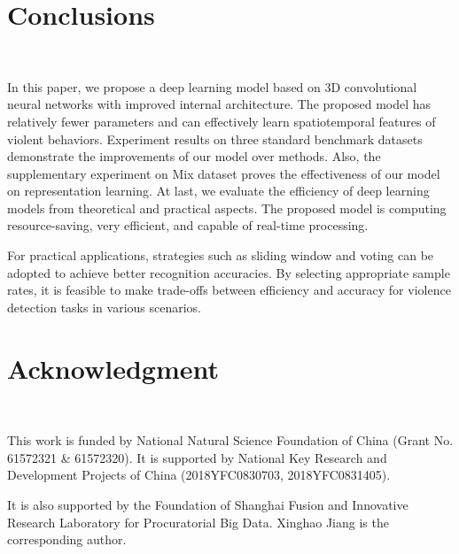 \documentclass[10pt,twocolumn,letterpaper]{article}
\begin{document}

\section{Conclusions}
~\label{sec:5}

In this paper, we propose a deep learning model based on 3D convolutional neural networks with improved internal architecture. 
The proposed model has relatively fewer parameters and can effectively learn spatiotemporal features of violent behaviors. 
Experiment results on three standard benchmark datasets demonstrate the improvements of our model over methods. 
Also, the supplementary experiment on Mix dataset proves the effectiveness of our model on representation learning. 
At last, we evaluate the efficiency of deep learning models from theoretical and practical aspects.
The proposed model is computing resource-saving, very efficient, and capable of real-time processing. 

For practical applications, strategies such as sliding window and voting can be adopted to achieve better recognition accuracies. 
By selecting appropriate sample rates, it is feasible to make trade-offs between efficiency and accuracy for violence detection tasks in various scenarios.


\section{Acknowledgment}
~\label{sec:6}

This work is funded by National Natural Science Foundation of China (Grant No. 61572321 \& 61572320).
It is supported by National Key Research and Development Projects of China (2018YFC0830703, 2018YFC0831405).

It is also supported by the Foundation of Shanghai Fusion and Innovative Research Laboratory for Procuratorial Big Data.
Xinghao Jiang is the corresponding author.

\end{document}
